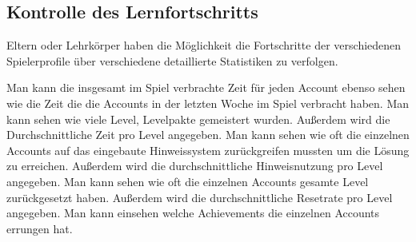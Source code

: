 \subsection{Kontrolle des Lernfortschritts}

\begin{requirements}
	Eltern oder Lehrkörper haben die Möglichkeit die Fortschritte der verschiedenen Spielerprofile über verschiedene detaillierte Statistiken zu verfolgen.
	\begin{requirements}
		 Man kann die insgesamt im Spiel verbrachte Zeit für jeden Account ebenso sehen wie die Zeit die die Accounts in der letzten Woche im Spiel verbracht haben. 
		 Man kann sehen wie viele Level, Levelpakte gemeistert wurden. Außerdem wird die Durchschnittliche Zeit pro Level angegeben.
		 Man kann sehen wie oft die einzelnen Accounts auf das eingebaute Hinweissystem zurückgreifen mussten um die Lösung zu erreichen. Außerdem wird die durchschnittliche Hinweisnutzung pro Level angegeben.
		 Man kann sehen wie oft die einzelnen Accounts gesamte Level zurückgesetzt haben. Außerdem wird die durchschnittliche Resetrate pro Level angegeben.
		 Man kann einsehen welche Achievements die einzelnen Accounts errungen hat.
	\end{requirements}
\end{requirements}


